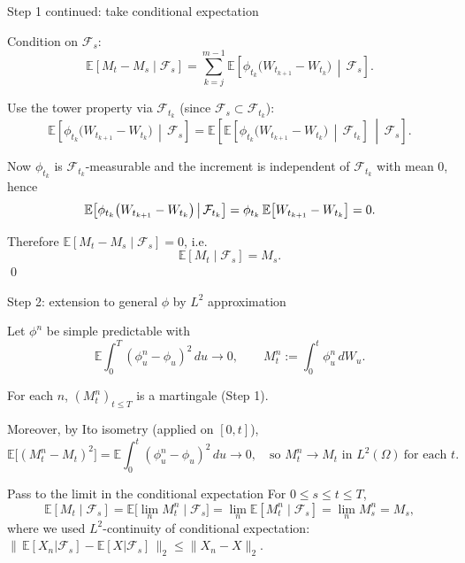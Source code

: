 \documentclass[10pt,aspectratio=169]{beamer}
\newcommand{\E}{\mathbb{E}}
\newcommand{\cF}{\mathcal{F}}
\begin{document}
\begin{frame}{Step 1 continued: take conditional expectation}

Condition on $\cF_s$:
\[
\E[M_t-M_s\mid \cF_s]
=
\sum_{k=j}^{m-1}\E\!\left[\phi_{t_k}\big(W_{t_{k+1}}-W_{t_k}\big)\,\middle|\,\cF_s\right].
\]
\pause

Use the tower property via $\cF_{t_k}$ (since $\cF_s\subset\cF_{t_k}$):
\[
\E\!\left[\phi_{t_k}\big(W_{t_{k+1}}-W_{t_k}\big)\,\middle|\,\cF_s\right]
=
\E\!\left[
\E\!\left[\phi_{t_k}\big(W_{t_{k+1}}-W_{t_k}\big)\,\middle|\,\cF_{t_k}\right]
\,\middle|\,\cF_s\right].
\]
\pause

Now $\phi_{t_k}$ is $\cF_{t_k}$-measurable and the increment is independent of $\cF_{t_k}$ with mean $0$, hence
\[
\E\!\left[\phi_{t_k}\big(W_{t_{k+1}}-W_{t_k}\big)\,\middle|\,\cF_{t_k}\right]
=
\phi_{t_k}\,\E\!\left[W_{t_{k+1}}-W_{t_k}\right]
=0.
\vspace{-3mm}
\]
\pause

Therefore $\E[M_t-M_s\mid \cF_s]=0$, i.e.
\[
\E[M_t\mid \cF_s]=M_s.
\]
\qed

\end{frame}

\begin{frame}{Step 2: extension to general $\phi$ by $L^2$ approximation}

Let $\phi^n$ be simple predictable with
\[
\E\int_0^T (\phi^n_u-\phi_u)^2\,du \to 0,
\qquad
M_t^n:=\int_0^t \phi^n_u\,dW_u.
\]
\pause

For each $n$, $(M_t^n)_{t\le T}$ is a martingale (Step 1).\pause

Moreover, by Ito isometry (applied on $[0,t]$),
\[
\E\big[(M_t^n-M_t)^2\big]
=
\E\int_0^t (\phi^n_u-\phi_u)^2\,du
\to 0,
\quad\text{so }M_t^n\to M_t\text{ in }L^2(\Omega)\ \text{for each }t.
\]
\pause

\begin{block}{Pass to the limit in the conditional expectation}
For $0\le s\le t\le T$,
\[
\E[M_t\mid \cF_s]
=
\E\big[\lim_{n} M_t^n\mid \cF_s\big]
=
\lim_{n}\E[M_t^n\mid \cF_s]
=
\lim_{n} M_s^n
=
M_s,
\]
where we used $L^2$-continuity of conditional expectation:
$\|\,\E[X_n|\cF_s]-\E[X|\cF_s]\,\|_2\le \|X_n-X\|_2$.
\end{block}

\end{frame}
\end{document}
